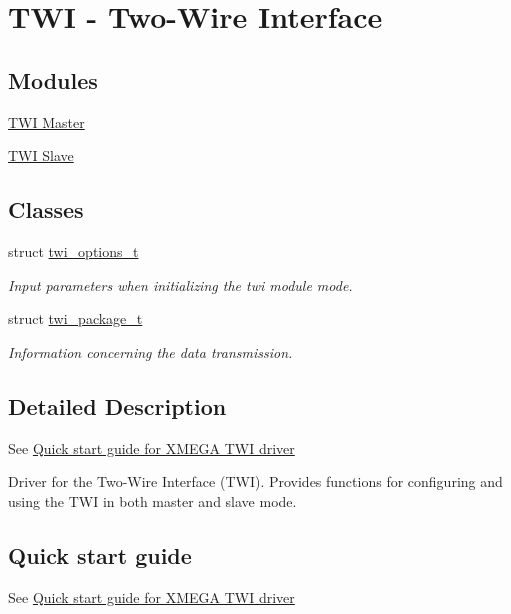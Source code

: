 \hypertarget{group__group__xmega__drivers__twi}{\section{T\-W\-I -\/ Two-\/\-Wire Interface}
\label{group__group__xmega__drivers__twi}
}
\subsection*{Modules}
\begin{DoxyCompactItemize}
\item 
\hyperlink{group__group__xmega__drivers__twi__twim}{T\-W\-I Master}
\item 
\hyperlink{group__group__xmega__drivers__twi__twis}{T\-W\-I Slave}
\end{DoxyCompactItemize}
\subsection*{Classes}
\begin{DoxyCompactItemize}
\item 
struct \hyperlink{structtwi__options__t}{twi\-\_\-options\-\_\-t}
\begin{DoxyCompactList}\small\item\em Input parameters when initializing the twi module mode. \end{DoxyCompactList}\item 
struct \hyperlink{structtwi__package__t}{twi\-\_\-package\-\_\-t}
\begin{DoxyCompactList}\small\item\em Information concerning the data transmission. \end{DoxyCompactList}\end{DoxyCompactItemize}


\subsection{Detailed Description}
See \hyperlink{xmega_twi_quickstart}{Quick start guide for X\-M\-E\-G\-A T\-W\-I driver}

Driver for the Two-\/\-Wire Interface (T\-W\-I). Provides functions for configuring and using the T\-W\-I in both master and slave mode.\hypertarget{group__group__xmega__drivers__twi_xmega_twi_quickstart_guide}{}\subsection{Quick start guide}\label{group__group__xmega__drivers__twi_xmega_twi_quickstart_guide}
See \hyperlink{xmega_twi_quickstart}{Quick start guide for X\-M\-E\-G\-A T\-W\-I driver} 